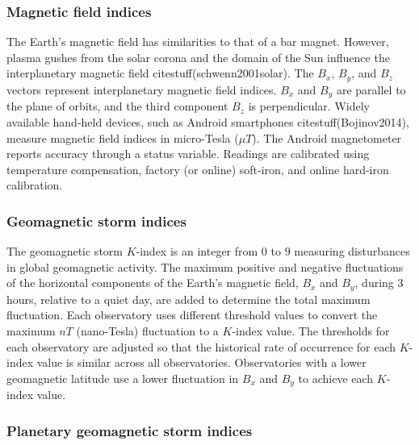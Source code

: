 \let\LaTeXcline\cline\documentclass[sn-mathphys-num]{sn-jnl}\let\cline\LaTeXcline
\begin{document}
\subsubsection{Magnetic field indices}

The Earth's magnetic field has similarities to that of a bar magnet. However, plasma gushes from the solar corona and the domain of the Sun influence the interplanetary magnetic field citestuff(schwenn2001solar). The $B_{x}$, $B_{y}$, and $B_{z}$ vectors represent interplanetary magnetic field indices. $B_{x}$ and $B_{y}$ are parallel to the plane of orbits, and the third component $B_{z}$ is perpendicular. Widely available hand-held devices, such as Android smartphones citestuff(Bojinov2014), measure magnetic field indices in micro-Tesla ($\mu T$). The Android magnetometer reports accuracy through a status variable. Readings are calibrated using temperature compensation, factory (or online) soft-iron, and online hard-iron calibration.
 
\subsubsection{Geomagnetic storm indices}

The geomagnetic storm $K$-index is an integer from $0$ to $9$ measuring disturbances in global geomagnetic activity. The maximum positive and negative fluctuations of the horizontal components of the Earth's magnetic field, $B_{x}$ and $B_{y}$, during $3$ hours, relative to a quiet day, are added to determine the total maximum fluctuation. Each observatory uses different threshold values to convert the maximum $nT$ (nano-Tesla) fluctuation to a $K$-index value. The thresholds for each observatory are adjusted so that the historical rate of occurrence for each $K$-index value is similar across all observatories. Observatories with a lower geomagnetic latitude use a lower fluctuation in $B_{x}$ and $B_{y}$ to achieve each $K$-index value.

\subsubsection{Planetary geomagnetic storm indices}
\end{document}

